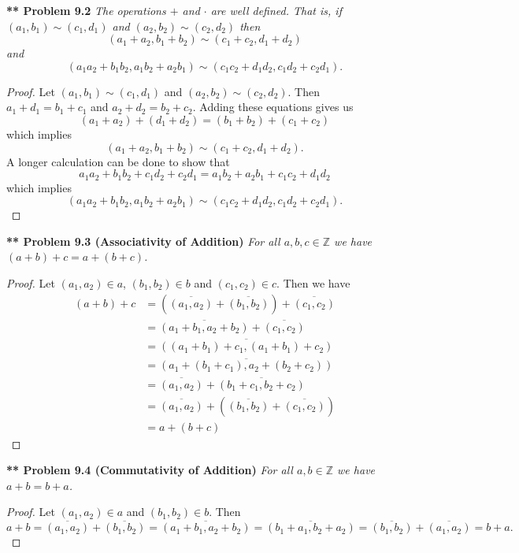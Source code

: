 \documentclass{article}
\begin{document}
\begin{flushleft}
\textbf{** Problem 9.2}
\textit{The operations $+$ and $\cdot$ are well defined. That is, if $(a_1, b_1) \sim (c_1, d_1)$ and $(a_2, b_2) \sim (c_2, d_2)$ then
\[
(a_1 + a_2, b_1 + b_2) \sim (c_1 + c_2, d_1 + d_2)
\]
and
\[
(a_1a_2 + b_1b_2, a_1b_2 + a_2b_1) \sim (c_1c_2 + d_1d_2, c_1d_2 + c_2d_1).
\]}
\begin{proof}
Let $(a_1, b_1) \sim (c_1, d_1)$ and $(a_2, b_2) \sim (c_2, d_2)$. Then $a_1 + d_1 = b_1 + c_1$ and $a_2 + d_2 = b_2 + c_2$. Adding these equations gives us
\[
(a_1 + a_2) + (d_1 + d_2) = (b_1 + b_2) + (c_1 + c_2)
\]
which implies
\[
(a_1 + a_2, b_1 + b_2) \sim (c_1 + c_2, d_1 + d_2).
\]
A longer calculation can be done to show that
\[
a_1a_2 + b_1b_2 + c_1d_2 + c_2d_1 = a_1b_2 + a_2b_1 + c_1c_2 + d_1d_2
\]
which implies
\[
(a_1a_2 + b_1b_2, a_1b_2 + a_2b_1) \sim (c_1c_2 + d_1d_2, c_1d_2 + c_2d_1).
\]
\end{proof}

\textbf{** Problem 9.3 (Associativity of Addition)}
\textit{For all $a,b,c \in \mathbb{Z}$ we have $(a+b) + c = a + (b + c)$.}
\begin{proof}
Let $(a_1,a_2) \in a$, $(b_1,b_2) \in b$ and $(c_1,c_2) \in c$. Then we have
\begin{align*}
(a + b) + c
&= \left ( \overline{(a_1, a_2)} + \overline{(b_1,b_2)} \right ) + \overline{(c_1, c_2)}\\
&= \overline{(a_1 + b_1, a_2 + b_2)} + \overline{(c_1, c_2)}\\
&= \overline{((a_1 + b_1) + c_1, (a_1 + b_1) + c_2)}\\
&= \overline{(a_1 + (b_1 + c_1), a_2 + (b_2 + c_2))}\\
&= \overline{(a_1, a_2)} + \overline{(b_1 + c_1, b_2 + c_2)}\\
&= \overline{(a_1, a_2)} + \left ( \overline{(b_1, b_2)} + \overline{(c_1, c_2)} \right )\\
&= a + (b + c)
\end{align*}
\end{proof}

\textbf{** Problem 9.4 (Commutativity of Addition)}
\textit{For all $a,b \in \mathbb{Z}$ we have $a + b = b + a$.}
\begin{proof}
Let $(a_1, a_2) \in a$ and $(b_1, b_2) \in b$. Then
\[
a + b = \overline{(a_1, a_2)} + \overline{(b_1, b_2)} = \overline{(a_1 + b_1, a_2 + b_2)} = \overline{(b_1 + a_1, b_2 + a_2)} = \overline{(b_1, b_2)} + \overline{(a_1, a_2)} = b + a.
\]
\end{proof}


\end{flushleft}
\end{document}
